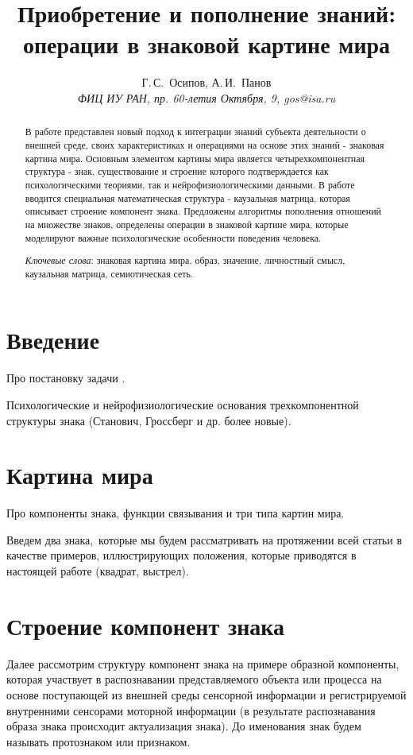 \documentclass[12pt]{scrartcl}
\title{Приобретение и пополнение знаний: операции в знаковой картине мира}
\author{Г.\,С.~Осипов, А.\,И.~Панов\\
	{\large\slshape ФИЦ ИУ РАН, пр. 60-летия Октября, 9, gos@isa.ru}}
\begin{document}
	
	\maketitle{}
	\begin{abstract}
		В работе представлен новый подход к интеграции знаний субъекта деятельности о внешней среде, своих характеристиках и операциями на основе этих знаний - знаковая картина мира. Основным элементом картины мира является четырехкомпонентная структура - знак, существование и строение которого подтверждается как психологическими теориями, так и нейрофизиологическими данными. В работе вводится специальная математическая структура - каузальная матрица, которая описывает строение компонент знака. Предложены алгоритмы пополнения отношений на множестве знаков, определены операции в знаковой картине мира, которые моделируют важные психологические особенности поведения человека.
		\par\bigskip
		\textit{Ключевые слова}: знаковая картина мира, образ, значение, личностный смысл, каузальная матрица, семиотическая сеть.
	\end{abstract}
	
	
	
	\section*{Введение}
	Про постановку задачи \cite{Osipov2014c,Osipov2015d}.
	
	Психологические и нейрофизиологические основания трехкомпонентной структуры знака (Станович, Гроссберг и др. более новые).
	
	\section{Картина мира}

	Про компоненты знака, функции связывания и три типа картин мира.
	
	Введем два знака,~которые мы будем рассматривать на протяжении всей статьи в качестве примеров, иллюстрирующих положения, которые приводятся в настоящей работе (квадрат, выстрел).
	
	
	\section{Строение компонент знака}
	
	Далее рассмотрим структуру компонент знака на примере образной компоненты, которая участвует в распознавании представляемого объекта или процесса на основе поступающей из внешней среды сенсорной информации и регистрируемой внутренними сенсорами моторной информации (в результате распознавания образа знака происходит актуализация знака). До именования знак будем называть протознаком или признаком.
	
\end{document}
